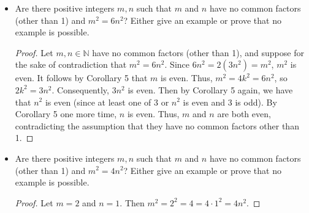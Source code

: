 \documentclass[titlepage]{article}
\newcommand{\N}{\mathbb{N}}
\begin{document}
\begin{itemize}
\begin{proof}
    \end{proof}
    \item Are there positive integers $m,n$ such that $m$ and $n$ have no common factors (other than 1) and $m^2=6n^2$? Either give an example or prove that no example is possible.
    \begin{proof}
        Let $m,n\in\N$ have no common factors (other than 1), and suppose for the sake of contradiction that $m^2=6n^2$. Since $6n^2=2(3n^2)=m^2$, $m^2$ is even. It follows by Corollary 5 that $m$ is even. Thus, $m^2=4k^2=6n^2$, so $2k^2=3n^2$. Consequently, $3n^2$ is even. Then by Corollary 5 again, we have that $n^2$ is even (since at least one of 3 or $n^2$ is even and 3 is odd). By Corollary 5 one more time, $n$ is even. Thus, $m$ and $n$ are both even, contradicting the assumption that they have no common factors other than 1.
    \end{proof}
    \item Are there positive integers $m,n$ such that $m$ and $n$ have no common factors (other than 1) and $m^2=4n^2$? Either give an example or prove that no example is possible.
    \begin{proof}
        Let $m=2$ and $n=1$. Then $m^2=2^2=4=4\cdot 1^2=4n^2$.
    \end{proof}
\end{itemize}


\end{document}
